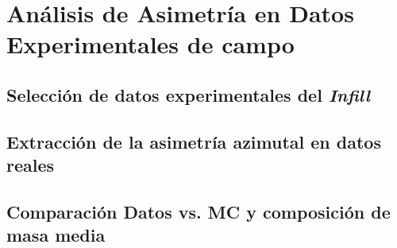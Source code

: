 
\chapter{Análisis de Asimetría en Datos Experimentales de campo}
\label{sec:datos_reales}

\section{Selección de datos experimentales del \textit{Infill}}
\label{subsec:seleccion_datos}

\section{Extracción de la asimetría azimutal en datos reales}
\label{subsec:extraccion_asimetria}

\section{Comparación Datos vs. MC y composición de masa media}
\label{subsec:comparacion_mc_datos}

\newpage
